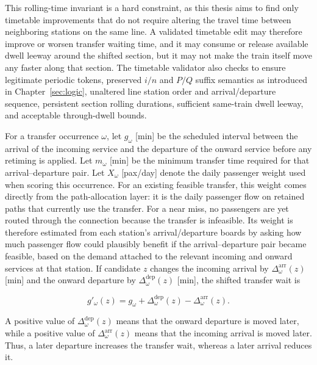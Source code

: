\documentclass[preprint,12pt]{elsarticle}
\begin{document}
This rolling-time invariant is a hard constraint, as this thesis aims to find only timetable improvements that do not require altering the travel time between neighboring stations on the same line. A validated timetable edit may therefore improve or worsen transfer waiting time, and it may consume or release available dwell leeway around the shifted section, but it may not make the train itself move any faster along that section. The timetable validator also checks to ensure legitimate periodic tokens, preserved \(i/n\) and \(P/Q\) suffix semantics as introduced in Chapter~\ref{sec:logic}, unaltered line station order and arrival/departure sequence, persistent section rolling durations, sufficient same-train dwell leeway, and acceptable through-dwell bounds.

For a transfer occurrence \(\omega\), let \(g_\omega\) [min] be the scheduled interval between the arrival of the incoming service and the departure of the onward service before any retiming is applied. Let \(m_\omega\) [min] be the minimum transfer time required for that arrival--departure pair. Let \(X_\omega\) [pax/day] denote the daily passenger weight used when scoring this occurrence. For an existing feasible transfer, this weight comes directly from the path-allocation layer: it is the daily passenger flow on retained paths that currently use the transfer. For a near miss, no passengers are yet routed through the connection because the transfer is infeasible. Its weight is therefore estimated from each station's arrival/departure boards by asking how much passenger flow could plausibly benefit if the arrival--departure pair became feasible, based on the demand attached to the relevant incoming and onward services at that station. If candidate \(z\) changes the incoming arrival by \(\Delta_\omega^{\mathrm{arr}}(z)\) [min] and the onward departure by \(\Delta_\omega^{\mathrm{dep}}(z)\) [min], the shifted transfer wait is

\begin{equation}
g'_\omega(z)
=
g_\omega
+
\Delta_\omega^{\mathrm{dep}}(z)
-
\Delta_\omega^{\mathrm{arr}}(z).
\label{eq:part2-shifted-wait}
\end{equation}

A positive value of \(\Delta_\omega^{\mathrm{dep}}(z)\) means that the onward departure is moved later, while a positive value of \(\Delta_\omega^{\mathrm{arr}}(z)\) means that the incoming arrival is moved later. Thus, a later departure increases the transfer wait, whereas a later arrival reduces it.
\end{document}

